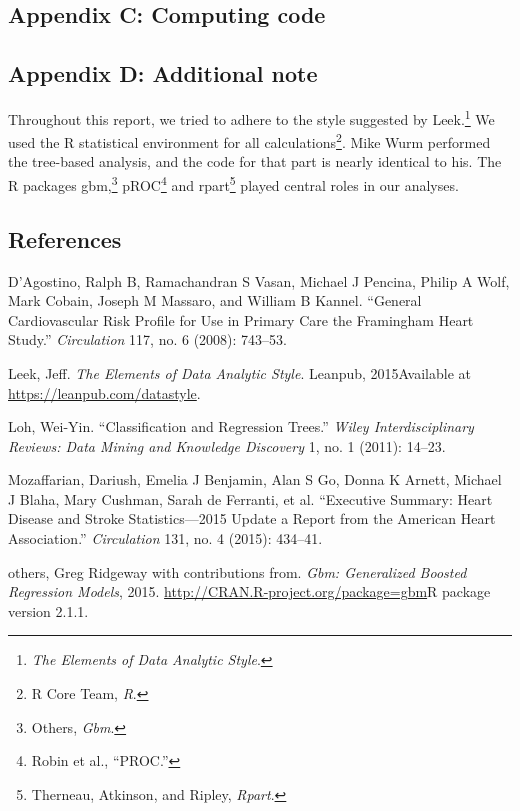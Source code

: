 \documentclass[11pt,]{article}
\let\rmarkdownfootnote\footnote%
\def\footnote{\protect\rmarkdownfootnote}
\begin{document}
\newpage

\subsection{Appendix C: Computing code}\label{appendix-c-computing-code}

\newpage

\subsection{Appendix D: Additional
note}\label{appendix-d-additional-note}

Throughout this report, we tried to adhere to the style suggested by
Leek.\footnote{\emph{The Elements of Data Analytic Style}.} We used the
R statistical environment for all calculations\footnote{R Core Team,
  \emph{R}. }. Mike Wurm performed the tree-based analysis, and the code
for that part is nearly identical to his. The R packages gbm,\footnote{Others,
  \emph{Gbm}. } pROC\footnote{Robin et al., ``PROC.'' } and
rpart\footnote{Therneau, Atkinson, and Ripley, \emph{Rpart}. } played
central roles in our analyses.

\subsection*{References}\label{references}

D'Agostino, Ralph B, Ramachandran S Vasan, Michael J Pencina, Philip A
Wolf, Mark Cobain, Joseph M Massaro, and William B Kannel. ``General
Cardiovascular Risk Profile for Use in Primary Care the Framingham Heart
Study.'' \emph{Circulation} 117, no. 6 (2008): 743--53.

Leek, Jeff. \emph{The Elements of Data Analytic Style}. Leanpub,
2015Available at \url{https://leanpub.com/datastyle}.

Loh, Wei-Yin. ``Classification and Regression Trees.'' \emph{Wiley
Interdisciplinary Reviews: Data Mining and Knowledge Discovery} 1, no. 1
(2011): 14--23.

Mozaffarian, Dariush, Emelia J Benjamin, Alan S Go, Donna K Arnett,
Michael J Blaha, Mary Cushman, Sarah de Ferranti, et al. ``Executive
Summary: Heart Disease and Stroke Statistics---2015 Update a Report from
the American Heart Association.'' \emph{Circulation} 131, no. 4 (2015):
434--41.

others, Greg Ridgeway with contributions from. \emph{Gbm: Generalized
Boosted Regression Models}, 2015.
\url{http://CRAN.R-project.org/package=gbm}R package version 2.1.1.
\end{document}
